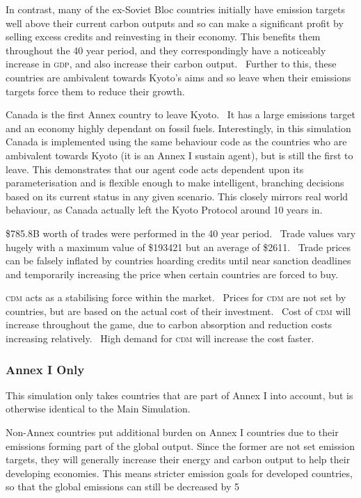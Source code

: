 In contrast, many of the ex-Soviet Bloc countries initially have emission targets well above their current carbon outputs and so can make a significant profit by selling excess credits and reinvesting in their economy. This benefits them throughout the 40 year period, and they correspondingly have a noticeably increase in \textsc{gdp}, and also increase their carbon output.  Further to this, these countries are ambivalent towards Kyoto’s aims and so leave when their emissions targets force them to reduce their growth.

Canada is the first Annex country to leave Kyoto.  It has a large emissions target and an economy highly dependant on fossil fuels. Interestingly, in this simulation Canada is implemented using the same behaviour code as the countries who are ambivalent towards Kyoto (it is an Annex I sustain agent), but is still the first to leave. This demonstrates that our agent code acts dependent upon its parameterisation and is flexible enough to make intelligent, branching decisions based on its current status in any given scenario. This closely mirrors real world behaviour, as Canada actually left the Kyoto Protocol around 10 years in.

\$785.8B worth of trades were performed in the 40 year period.  Trade values vary hugely with a maximum value of \$193421 but an average of \$2611.  Trade prices can be falsely inflated by countries hoarding credits until near sanction deadlines and temporarily increasing the price when certain countries are forced to buy.

\textsc{cdm} acts as a stabilising force within the market.  Prices for \textsc{cdm} are not set by countries, but are based on the actual cost of their investment.  Cost of \textsc{cdm} will increase throughout the game, due to carbon absorption and reduction costs increasing relatively.  High demand for \textsc{cdm} will increase the cost faster.

\subsubsection{Annex I Only}

This simulation only takes countries that are part of Annex I into account, but is otherwise identical to the Main Simulation.

Non-Annex countries put additional burden on Annex I countries due to their emissions forming part of the global output. Since the former are not set emission targets, they will generally increase their energy and carbon output to help their developing economies. This means stricter emission goals for developed countries, so that the global emissions can still be decreased by 5%

